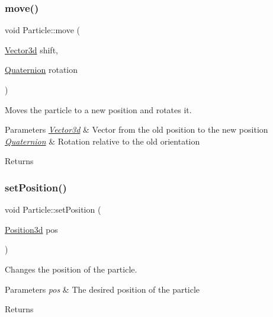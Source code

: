 \subsubsection{\texorpdfstring{move()}{move()}}
{\footnotesize\ttfamily void Particle\+::move (\begin{DoxyParamCaption}\item[{\hyperlink{structVector3d}{Vector3d}}]{shift,  }\item[{\hyperlink{structQuaternion}{Quaternion}}]{rotation }\end{DoxyParamCaption})}



Moves the particle to a new position and rotates it. 


\begin{DoxyParams}{Parameters}
{\em \hyperlink{structVector3d}{Vector3d}} & Vector from the old position to the new position \\
\hline
{\em \hyperlink{structQuaternion}{Quaternion}} & Rotation relative to the old orientation\\
\hline
\end{DoxyParams}
\begin{DoxyReturn}{Returns}

\end{DoxyReturn}
\mbox{\label{classParticle_a46c4e13f7e8d88e9747ba8ef1f974bbe}} 
\subsubsection{\texorpdfstring{set\+Position()}{setPosition()}}
{\footnotesize\ttfamily void Particle\+::set\+Position (\begin{DoxyParamCaption}\item[{\hyperlink{classPosition3d}{Position3d}}]{pos }\end{DoxyParamCaption})}



Changes the position of the particle. 


\begin{DoxyParams}{Parameters}
{\em pos} & The desired position of the particle\\
\hline
\end{DoxyParams}
\begin{DoxyReturn}{Returns}

\end{DoxyReturn}
\mbox{\label{classParticle_a0aea1cf9a6dec45251a6c55586a7a6cc}} 
